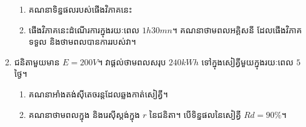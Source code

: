 \begin{enumerate}
\begin{enumerate}[k,2]
		\item គណនាទិន្នផលរបស់ផើងវិភាគនេះ
		\item ផើងវិភាគនេះដំណើរការក្នុងរយៈពេល $1h30mn$។ គណនាថាមពលអគ្គិសនី ដែលផើងវិភាគទទួល និងថាមពលបានការរបស់វា។
	\end{enumerate}
	\item ជនិតាមួយមាន $E=200V$។ វាផ្តល់ថាមពលសរុប $240kWh$ ទៅក្នុងសៀគ្វីមួយក្នុងរយៈពេល $5$ថ្ងៃ។
	\begin{enumerate}[k]
		\item គណនាអាំងតង់ស៊ីតេចរន្តដែលឆ្លងកាត់សៀគ្វី។
		\item គណនាថាមពលក្នុង និងរេស៊ីស្តង់ក្នុង $r$ នៃជនិតា។ បើទិន្នផលនៃសៀគ្វី $Rd=90\%$។
	\end{enumerate}
\end{enumerate}